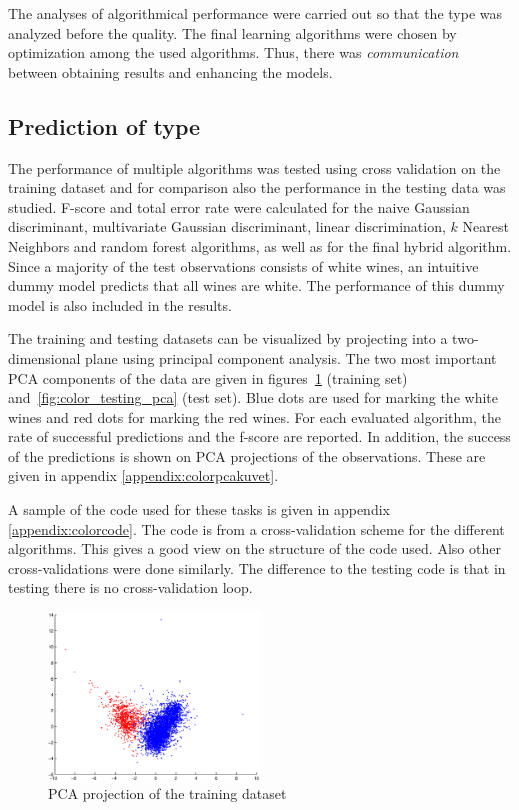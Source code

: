 \documentclass[twoside]{article}
\begin{document}
\begin{multicols}{2}
The analyses of algorithmical performance were carried out so that the type was analyzed before the quality. The final learning algorithms
were chosen by optimization among the used algorithms. Thus, there was \emph{communication} between obtaining results and enhancing the models.

\subsection{Prediction of type}

The performance of multiple algorithms was tested using cross validation on the training dataset and for comparison also the performance in the testing data was studied.
F-score and total error rate were calculated for the naive Gaussian discriminant, multivariate Gaussian discriminant, linear discrimination, $k$ Nearest Neighbors and random forest
algorithms, as well as for the final hybrid algorithm.
Since a majority of the test observations consists of white wines, an intuitive dummy model predicts that all wines are white. The performance of this dummy model
is also included in the results.

The training and testing datasets can be visualized by projecting into a two-dimensional plane using principal component analysis. The two most important
PCA components of the data are given in figures~\ref{fig:color_training_pca} (training set) and~\ref{fig:color_testing_pca} (test set). 
Blue dots are used for marking the white wines and red dots for marking the red wines.
For each evaluated algorithm, the rate of successful predictions and the f-score are reported. In addition, the success of the predictions is shown on PCA projections
of the observations. These are given in appendix \ref{appendix:colorpcakuvet}.

A sample of the code used for these tasks is given in appendix \ref{appendix:colorcode}. The code is from a cross-validation scheme for the different
algorithms. This gives a good view on the structure of the code used. Also other cross-validations were done similarly. The difference to the testing code is
that in testing there is no cross-validation loop.

\begin{figure}[H]
\centering
\includegraphics[width=0.5\textwidth]{trainingpca}
\caption{PCA projection of the training dataset}
\label{fig:color_training_pca}
\end{figure}


\end{multicols}
\end{document}
